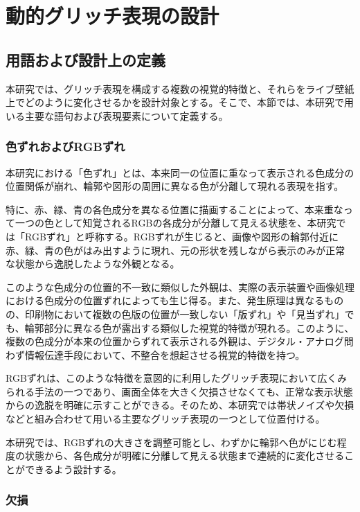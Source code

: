 \chapter{動的グリッチ表現の設計}


\section{用語および設計上の定義}

本研究では、グリッチ表現を構成する複数の視覚的特徴と、それらをライブ壁紙上でどのように変化させるかを設計対象とする。そこで、本節では、本研究で用いる主要な語句および表現要素について定義する。


\subsection{色ずれおよびRGBずれ}

本研究における「色ずれ」とは、本来同一の位置に重なって表示される色成分の位置関係が崩れ、輪郭や図形の周囲に異なる色が分離して現れる表現を指す。

特に、赤、緑、青の各色成分を異なる位置に描画することによって、本来重なって一つの色として知覚されるRGBの各成分が分離して見える状態を、本研究では「RGBずれ」と呼称する。RGBずれが生じると、画像や図形の輪郭付近に赤、緑、青の色がはみ出すように現れ、元の形状を残しながら表示のみが正常な状態から逸脱したような外観となる。

このような色成分の位置的不一致に類似した外観は、実際の表示装置や画像処理における色成分の位置ずれによっても生じ得る。また、発生原理は異なるものの、印刷物において複数の色版の位置が一致しない「版ずれ」や「見当ずれ」でも、輪郭部分に異なる色が露出する類似した視覚的特徴が現れる。このように、複数の色成分が本来の位置からずれて表示される外観は、デジタル・アナログ問わず情報伝達手段において、不整合を想起させる視覚的特徴を持つ。

RGBずれは、このような特徴を意図的に利用したグリッチ表現において広くみられる手法の一つであり、画面全体を大きく欠損させなくても、正常な表示状態からの逸脱を明確に示すことができる。そのため、本研究では帯状ノイズや欠損などと組み合わせて用いる主要なグリッチ表現の一つとして位置付ける。

本研究では、RGBずれの大きさを調整可能とし、わずかに輪郭へ色がにじむ程度の状態から、各色成分が明確に分離して見える状態まで連続的に変化させることができるよう設計する。

\subsection{欠損}

